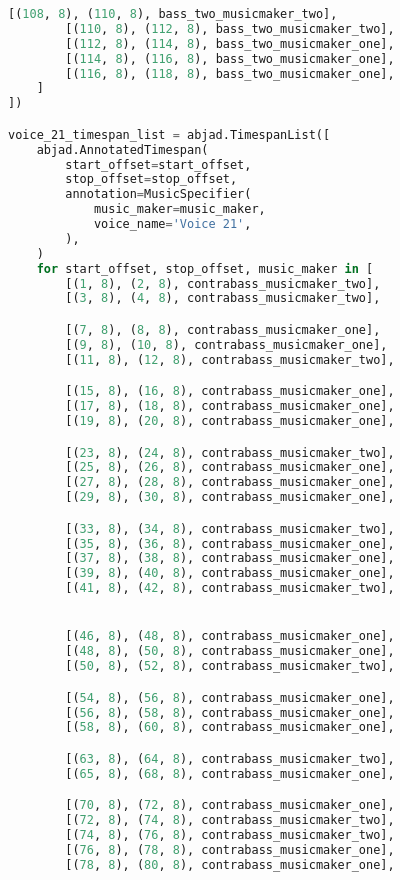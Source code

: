 \begin{lstlisting}[language=Python, caption=Invocation Source Code]
        [(108, 8), (110, 8), bass_two_musicmaker_two],
        [(110, 8), (112, 8), bass_two_musicmaker_two],
        [(112, 8), (114, 8), bass_two_musicmaker_one],
        [(114, 8), (116, 8), bass_two_musicmaker_one],
        [(116, 8), (118, 8), bass_two_musicmaker_one],
    ]
])

voice_21_timespan_list = abjad.TimespanList([
    abjad.AnnotatedTimespan(
        start_offset=start_offset,
        stop_offset=stop_offset,
        annotation=MusicSpecifier(
            music_maker=music_maker,
            voice_name='Voice 21',
        ),
    )
    for start_offset, stop_offset, music_maker in [
        [(1, 8), (2, 8), contrabass_musicmaker_two],
        [(3, 8), (4, 8), contrabass_musicmaker_two],

        [(7, 8), (8, 8), contrabass_musicmaker_one],
        [(9, 8), (10, 8), contrabass_musicmaker_one],
        [(11, 8), (12, 8), contrabass_musicmaker_two],

        [(15, 8), (16, 8), contrabass_musicmaker_one],
        [(17, 8), (18, 8), contrabass_musicmaker_one],
        [(19, 8), (20, 8), contrabass_musicmaker_one],

        [(23, 8), (24, 8), contrabass_musicmaker_two],
        [(25, 8), (26, 8), contrabass_musicmaker_one],
        [(27, 8), (28, 8), contrabass_musicmaker_one],
        [(29, 8), (30, 8), contrabass_musicmaker_one],

        [(33, 8), (34, 8), contrabass_musicmaker_two],
        [(35, 8), (36, 8), contrabass_musicmaker_one],
        [(37, 8), (38, 8), contrabass_musicmaker_one],
        [(39, 8), (40, 8), contrabass_musicmaker_one],
        [(41, 8), (42, 8), contrabass_musicmaker_two],


        [(46, 8), (48, 8), contrabass_musicmaker_one],
        [(48, 8), (50, 8), contrabass_musicmaker_one],
        [(50, 8), (52, 8), contrabass_musicmaker_two],

        [(54, 8), (56, 8), contrabass_musicmaker_one],
        [(56, 8), (58, 8), contrabass_musicmaker_one],
        [(58, 8), (60, 8), contrabass_musicmaker_one],

        [(63, 8), (64, 8), contrabass_musicmaker_two],
        [(65, 8), (68, 8), contrabass_musicmaker_one],

        [(70, 8), (72, 8), contrabass_musicmaker_one],
        [(72, 8), (74, 8), contrabass_musicmaker_two],
        [(74, 8), (76, 8), contrabass_musicmaker_two],
        [(76, 8), (78, 8), contrabass_musicmaker_one],
        [(78, 8), (80, 8), contrabass_musicmaker_one],


\end{lstlisting}
